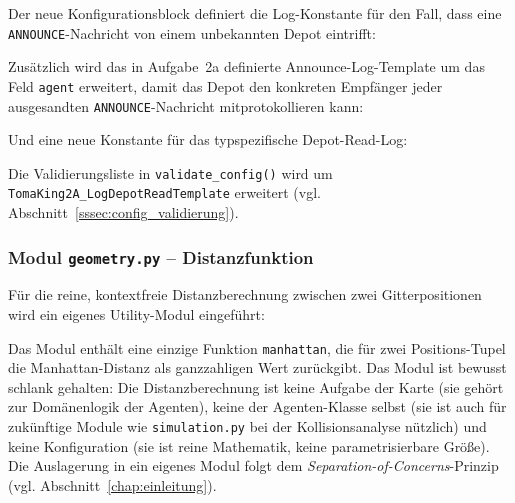 Der neue Konfigurationsblock definiert die Log-Konstante für den Fall, dass eine \texttt{ANNOUNCE}-Nachricht von einem unbekannten Depot eintrifft:



Zusätzlich wird das in Aufgabe~2a definierte Announce-Log-Template um das Feld \texttt{agent} erweitert, damit das Depot den konkreten Empfänger jeder ausgesandten \texttt{ANNOUNCE}-Nachricht mitprotokollieren kann:



Und eine neue Konstante für das typspezifische Depot-Read-Log:



Die Validierungsliste in \texttt{validate\_config()} wird um \texttt{TomaKing2A\_LogDepotReadTemplate} erweitert (vgl. Abschnitt~\ref{sssec:config_validierung}).


\subsubsection{Modul \texttt{geometry.py} – Distanzfunktion}

Für die reine, kontextfreie Distanzberechnung zwischen zwei Gitterpositionen wird ein eigenes Utility-Modul eingeführt:



Das Modul enthält eine einzige Funktion \texttt{manhattan}, die für zwei Positions-Tupel die Manhattan-Distanz als ganzzahligen Wert zurückgibt. Das Modul ist bewusst schlank gehalten: Die Distanzberechnung ist keine Aufgabe der Karte (sie gehört zur Domänenlogik der Agenten), keine der Agenten-Klasse selbst (sie ist auch für zukünftige Module wie \texttt{simulation.py} bei der Kollisionsanalyse nützlich) und keine Konfiguration (sie ist reine Mathematik, keine parametrisierbare Größe). Die Auslagerung in ein eigenes Modul folgt dem \textit{Separation-of-Concerns}-Prinzip (vgl. Abschnitt~\ref{chap:einleitung}).

